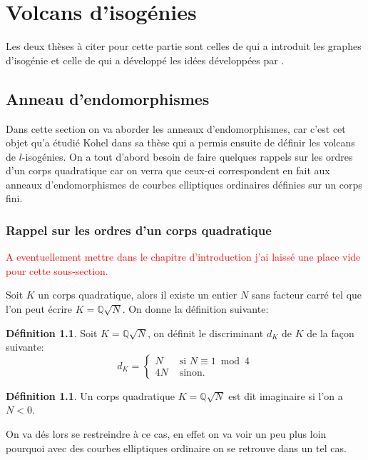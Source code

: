 \documentclass[10pt,a4paper]{book}
\theoremstyle{plain}
\theoremstyle{definition}
\theoremstyle{definition}
\theoremstyle{definition}
\theoremstyle{definition}
\newtheorem{defi}[thm]{Définition}
\theoremstyle{remark}
\theoremstyle{remark}
\begin{document}
\chapter{Volcans d'isogénies}
Les deux thèses à citer pour cette partie sont celles de \cite{Kohel96} qui a introduit les graphes d'isogénie et celle de  \cite{Fouquet01} qui a développé les idées développées par \cite{Kohel96}.

\section{Anneau d'endomorphismes}

Dans cette section on va aborder les anneaux d'endomorphismes, car c'est cet objet qu'a étudié Kohel dans sa thèse \cite{Kohel96} qui a permis ensuite de définir les volcans de $l$-isogénies. On a tout d'abord besoin de faire quelques rappels sur les ordres d'un corps quadratique car on verra que ceux-ci correspondent en fait aux anneaux d'endomorphismes de courbes elliptiques ordinaires définies sur un corps fini.

\subsection{Rappel sur les ordres d'un corps quadratique}
\textcolor{red}{A eventuellement mettre dans le chapitre d'introduction j'ai laissé une place vide pour cette sous-section.}

Soit $K$ un corps quadratique, alors il existe un entier $N$ sans facteur carré tel que l'on peut écrire $K=\mathbb{Q}\sqrt{N}$. On donne la définition suivante:
\begin{defi}
Soit $K=\mathbb{Q}\sqrt{N}$, on définit le discriminant $d_K$ de $K$ de la façon suivante: 
\begin{equation*}
d_K=\begin{cases}
N & \text{ si }  N \equiv 1 \bmod 4 \\
4N & \text{ sinon.}
\end{cases}
\end{equation*}
\end{defi}

\begin{defi}
Un corps quadratique $K=\mathbb{Q}\sqrt{N}$ est dit imaginaire si l'on a $N<0$. 
\end{defi}

On va dés lors se restreindre à ce cas, en effet on va voir un peu plus loin pourquoi avec des courbes elliptiques ordinaire on se retrouve dans un tel cas.
\end{document}
